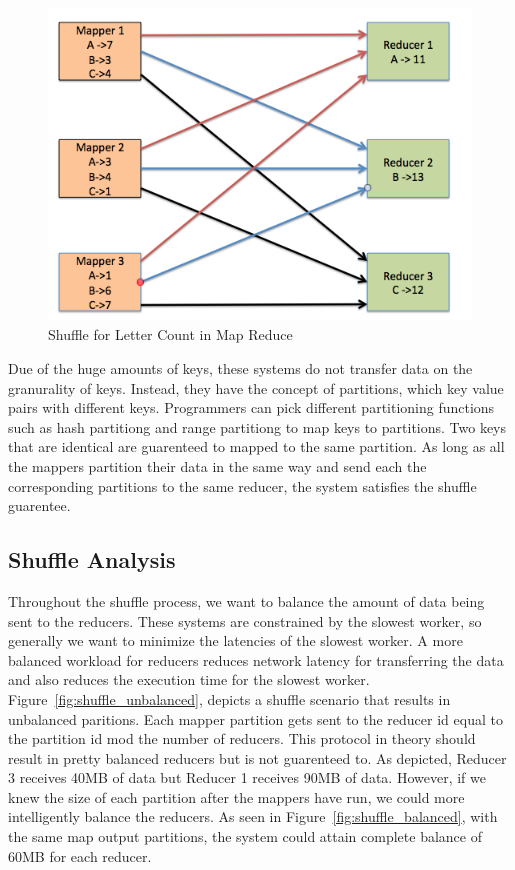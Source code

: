 \begin{figure}[h]
\begin{center}
\includegraphics[scale=1.0]{./img/shuffle_basic.png}
\caption{Shuffle for Letter Count in Map Reduce}
\label{fig:shuffle_basic}
\end{center}
\end{figure}

Due of the huge amounts of keys, these systems do not transfer data on the granurality of keys.
Instead, they have the concept of partitions, which key value pairs with different keys. Programmers can pick different partitioning functions such as hash partitiong and range partitiong to map keys to partitions. Two keys that are identical are guarenteed to mapped to the same partition. As long as all the mappers partition their data in the same way and send each the corresponding partitions to the same reducer, the system satisfies 
the shuffle guarentee. 

\subsection {Shuffle Analysis}

Throughout the shuffle process, we want to balance the amount of data being sent to the reducers. 
These systems are constrained by the slowest worker, so generally we want to minimize the latencies of the slowest worker.
A more balanced workload for reducers reduces network latency for transferring the data and also reduces the execution time for the slowest worker.
Figure~\ref{fig:shuffle_unbalanced}, depicts a shuffle scenario that results in unbalanced paritions. Each mapper partition gets sent to the reducer id equal to the partition id mod the number of reducers. This protocol in theory should result in pretty balanced reducers but is not guarenteed to. As depicted, Reducer 3 receives 
40MB of data but Reducer 1 receives 90MB of data. However, if we knew the size of each partition after the mappers have run,
we could more intelligently balance the reducers. As seen in Figure~\ref{fig:shuffle_balanced}, with the same map output partitions, the system could attain complete balance
of 60MB for each reducer.


